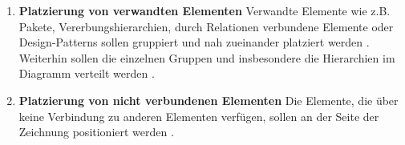 \begin{enumerate}[label={\aestheticscriterialabel.\arabic*}, resume]
\item
\label{pri:related-elements-placement}
\textbf{Platzierung von verwandten Elementen}
Verwandte Elemente wie z.B. Pakete, Vererbungshierarchien, durch Relationen verbundene Elemente oder Design-Patterns sollen gruppiert und nah zueinander platziert werden \cite{Eichelberger05Aesthetics, Siebenhaller03Automatisches}. Weiterhin sollen die einzelnen Gruppen und insbesondere die Hierarchien im Diagramm verteilt werden \cite{Eiglsperger04Automatic}.

\item
\label{pri:unconnencted-elements-placement}
\textbf{Platzierung von nicht verbundenen Elementen}
Die Elemente, die über keine Verbindung zu anderen Elementen verfügen, sollen an der Seite der Zeichnung positioniert werden \cite{EichelbergerSchmid09Guidelines}.

\end{enumerate}
